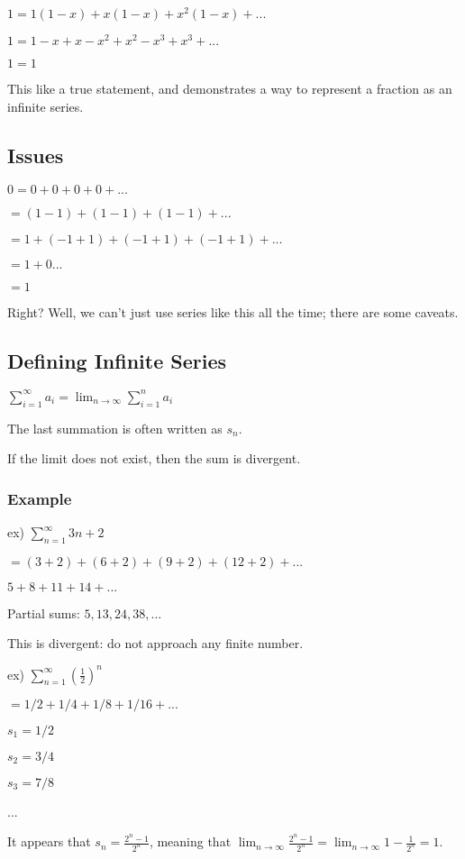 \documentclass{article}
\begin{document}
$1 = 1(1-x)+x(1-x)+x^2(1-x)+...$

$1 = 1-x+x-x^2+x^2-x^3+x^3+...$

$1=1$

This like a true statement, and demonstrates a way to represent a fraction as an infinite series.

\subsection{Issues}

$0 = 0+0+0+0+...$

$ = (1-1)+(1-1)+(1-1)+...$

$=1+(-1+1)+(-1+1)+(-1+1)+...$

$=1+0...$

$=1$

Right? Well, we can't just use series like this all the time; there are some caveats.

\subsection{Defining Infinite Series}

$\sum_{i=1}^{\infty} a_i = \lim_{n\to\infty} \sum_{i=1}^{n} a_i$ 

The last summation is often written as $s_n$.

If the limit does not exist, then the sum is divergent. 

\subsubsection{Example}

ex) $\sum_{n=1}^{\infty} 3n+2$

$ = (3+2)+(6+2)+(9+2)+(12+2)+...$

$5+8+11+14+...$

Partial sums: $5,13,24,38,...$

This is divergent: do not approach any finite number.


ex) $\sum_{n=1}^{\infty}(\frac{1}{2})^n$

$=1/2+1/4+1/8+1/16+...$

$s_1 = 1/2$

$s_2 = 3/4$

$s_3 = 7/8$

...

It appears that $s_n = \frac{2^n-1}{2^n}$, meaning that $\lim_{n\to\infty} \frac{2^n-1}{2^n} = \lim_{n\to\infty} 1-\frac{1}{2^n} = 1$.
\end{document}
